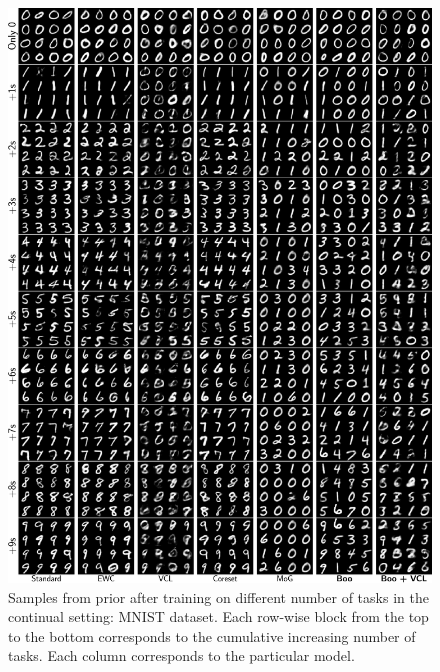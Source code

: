 \begin{figure}[ht]
		\centering
		\includegraphics[width=\textwidth]{pics/1_boovae/MNIST_full.pdf}
		\caption{Samples from prior after training on different number of tasks  in the continual setting: MNIST dataset. Each row-wise block from the top to the bottom corresponds to the cumulative increasing number of tasks. Each column corresponds to the particular model.}
		\label{fig:MNIST_gen}
\end{figure}

